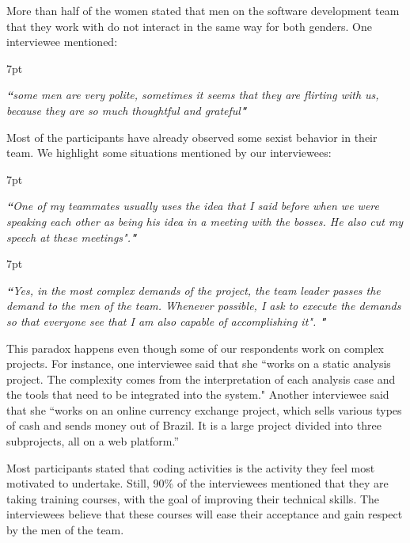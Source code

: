 \documentclass{IEEEcsmag}
\newenvironment{formal}{%
  \def\FrameCommand{%
    \hspace{1pt}%
    {\color{formalshade}\vrule width 2pt}%
    {\color{formalshade}\vrule width 4pt}%
    \colorbox{formalshade}%
  }%
  \MakeFramed{\advance\hsize-\width\FrameRestore}%
  \noindent\hspace{-4.55pt}%
  \begin{adjustwidth}{}{7pt}%
  \vspace{2pt}\vspace{2pt}%
}
{%
  \vspace{2pt}\end{adjustwidth}\endMakeFramed%
}
\begin{document}


More than half of the women stated that men on the software development team that they work with do not interact in the same way for both genders. One interviewee mentioned:
\begin{formal}
\emph{{\bf``}some men are very polite, sometimes it seems that they are flirting with us, because they are so much thoughtful and grateful{\bf"}}
\end{formal} 

Most of the participants have already observed some sexist behavior in their team. We highlight some situations mentioned by our interviewees: 

\begin{formal}
\emph{{\bf``}One of my teammates usually uses the idea that I said before when we were speaking each other as being his idea in a meeting with the bosses. He also cut my speech at these meetings".{\bf"}}
\end{formal} 

\begin{formal}
\emph{{\bf``}Yes, in the most complex demands of the project, the team leader passes the demand to the men of the team. Whenever possible, I ask to execute the demands so that everyone see that I am also capable of accomplishing it". {\bf"}}

\end{formal}  

This paradox happens even though some of our respondents work on complex projects. For instance, one interviewee said that she  ``works on a static analysis project. The complexity comes from the interpretation of each analysis case and the tools that need to be integrated into the system." Another interviewee said that she ``works on an online currency exchange project, which sells various types of cash and sends money out of Brazil. It is a large project divided into three subprojects, all on a web platform.'' 


Most participants stated that coding activities is the activity they feel most motivated to undertake. Still, 90\% of the interviewees mentioned that they are taking training courses, with the goal of improving their technical skills. The interviewees believe that these courses will ease their acceptance and gain respect by the men of the team.
\end{document}

